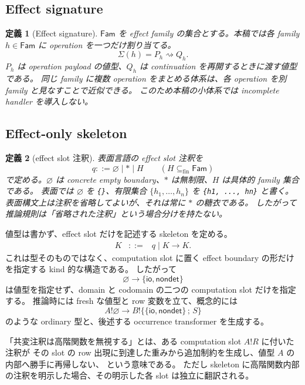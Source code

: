 \documentclass[uplatex,dvipdfmx,a4paper,11pt]{jsarticle}
\theoremstyle{jpplain}
\newtheorem{definition}{定義}[section]
\newcommand{\Fam}{\mathsf{Fam}}
\newcommand{\eff}{\mathbin{!}}
\newcommand{\row}[2]{\{#1\,;\,#2\}}
\newcommand{\emptyrow}{\varnothing}
\newcommand{\starann}{\ast}
\begin{document}
\subsection{Effect signature}

\begin{definition}[Effect signature]
$\Fam$ を effect family の集合とする。本稿では各 family $h\in\Fam$ に operation を一つだけ割り当てる。
\[
  \Sigma(h)=P_h\rightsquigarrow Q_h.
\]
$P_h$ は operation payload の値型、$Q_h$ は continuation を再開するときに渡す値型である。
同じ family に複数 operation をまとめる体系は、各 operation を別 family と見なすことで近似できる。
このため本稿の小体系では incomplete handler を導入しない。
\end{definition}

\subsection{Effect-only skeleton}

\begin{definition}[effect slot 注釈]
表面言語の effect slot 注釈を
\[
 q ::= \emptyrow \mid \starann \mid H
 \qquad(H\subseteq_{\mathrm{fin}}\Fam)
\]
で定める。$\emptyrow$ は concrete empty boundary、$\starann$ は無制限、$H$ は具体的 family 集合である。
表面では $\emptyrow$ を \texttt{\{\}}、有限集合 $\{h_1,\ldots,h_n\}$ を
\texttt{\{h1, ..., hn\}} と書く。
表面構文上は注釈を省略してよいが、それは常に $\starann$ の糖衣である。
したがって推論規則は「省略された注釈」という場合分けを持たない。
\end{definition}

値型は書かず、effect slot だけを記述する skeleton を定める。
\[
\begin{array}{rcl}
 K &::=& q \mid K\to K.
\end{array}
\]
これは型そのものではなく、computation slot に置く effect boundary の形だけを指定する kind 的な構造である。
したがって
\[
  \emptyrow\to\{\mathsf{io},\mathsf{nondet}\}
\]
は値型を指定せず、domain と codomain の二つの computation slot だけを指定する。
推論時には fresh な値型と row 変数を立て、概念的には
\[
  A\eff\emptyrow \to B\eff\row{\{\mathsf{io},\mathsf{nondet}\}}S
\]
のような ordinary 型と、後述する occurrence transformer を生成する。

\begin{readingbox}
「共変注釈は高階関数を無視する」とは、ある computation slot $A\eff R$ に付いた注釈が
その slot の row 出現に到達した重みから追加制約を生成し、値型 $A$ の内部へ勝手に再帰しない、
という意味である。
ただし skeleton に高階関数内部の注釈を明示した場合、その明示した各 slot は独立に翻訳される。
\end{readingbox}
\end{document}
